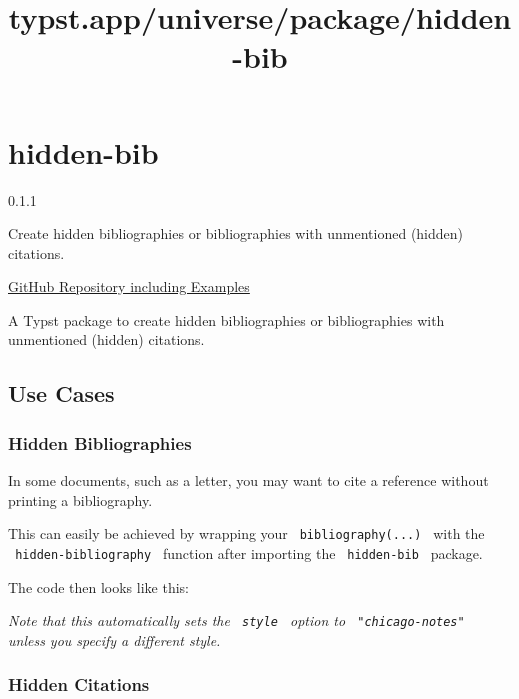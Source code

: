 \title{typst.app/universe/package/hidden-bib}

\label{banner}
\section{hidden-bib}\label{hidden-bib}

{ 0.1.1 }

Create hidden bibliographies or bibliographies with unmentioned (hidden)
citations.

\label{readme}
\href{https://github.com/pklaschka/typst-hidden-bib}{GitHub Repository
including Examples}

A Typst package to create hidden bibliographies or bibliographies with
unmentioned (hidden) citations.

\subsection{Use Cases}\label{use-cases}

\subsubsection{Hidden Bibliographies}\label{hidden-bibliographies}

In some documents, such as a letter, you may want to cite a reference
without printing a bibliography.

This can easily be achieved by wrapping your
\texttt{\ bibliography(...)\ } with the \texttt{\ hidden-bibliography\ }
function after importing the \texttt{\ hidden-bib\ } package.

The code then looks like this:

\begin{Shaded}
\begin{Highlighting}[]


\NormalTok{)}
\end{Highlighting}
\end{Shaded}

\emph{Note that this automatically sets the \texttt{\ style\ } option to
\texttt{\ "chicago-notes"\ } unless you specify a different style.}

\subsubsection{Hidden Citations}\label{hidden-citations}

